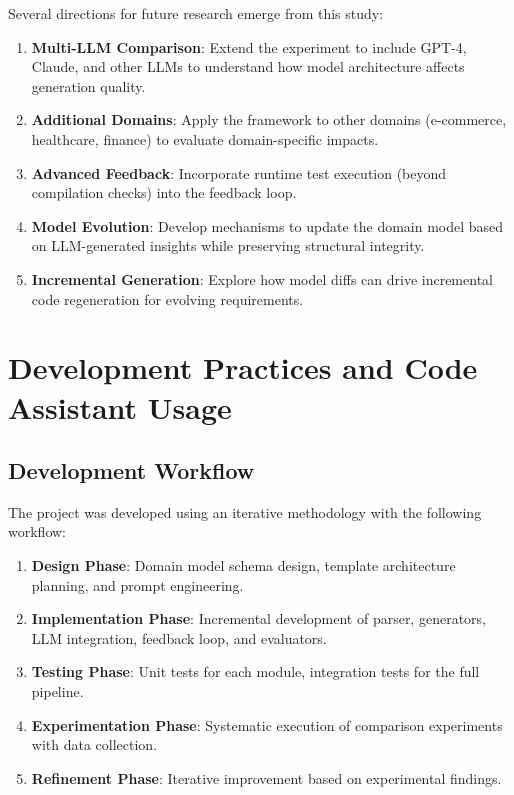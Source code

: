 \documentclass[11pt,a4paper]{article}
\begin{document}
Several directions for future research emerge from this study:

\begin{enumerate}[leftmargin=*]
    \item \textbf{Multi-LLM Comparison}: Extend the experiment to include GPT-4, Claude, and other LLMs to understand how model architecture affects generation quality.
    \item \textbf{Additional Domains}: Apply the framework to other domains (e-commerce, healthcare, finance) to evaluate domain-specific impacts.
    \item \textbf{Advanced Feedback}: Incorporate runtime test execution (beyond compilation checks) into the feedback loop.
    \item \textbf{Model Evolution}: Develop mechanisms to update the domain model based on LLM-generated insights while preserving structural integrity.
    \item \textbf{Incremental Generation}: Explore how model diffs can drive incremental code regeneration for evolving requirements.
\end{enumerate}

\newpage
\section{Development Practices and Code Assistant Usage}
\label{sec:development}

\subsection{Development Workflow}

The project was developed using an iterative methodology with the following workflow:

\begin{enumerate}[leftmargin=*]
    \item \textbf{Design Phase}: Domain model schema design, template architecture planning, and prompt engineering.
    \item \textbf{Implementation Phase}: Incremental development of parser, generators, LLM integration, feedback loop, and evaluators.
    \item \textbf{Testing Phase}: Unit tests for each module, integration tests for the full pipeline.
    \item \textbf{Experimentation Phase}: Systematic execution of comparison experiments with data collection.
    \item \textbf{Refinement Phase}: Iterative improvement based on experimental findings.
\end{enumerate}
\end{document}
